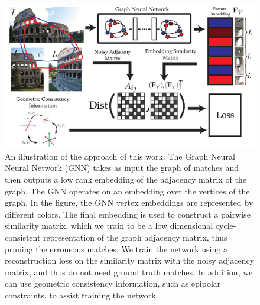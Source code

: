 \documentclass{article} %
\begin{document}

\begin{figure}[t]
\begin{center}
  \includegraphics[width=0.8\linewidth]{figures-CycleConsistencyMainFigure-v4.pdf}
\end{center}
  \caption{
    An illustration of the approach of this work.
    The Graph Neural Neural Network (GNN) \cite{battaglia2018relational} takes as input the graph of matches and then outputs a low rank embedding of the adjacency matrix of the graph.
    The GNN operates on an embedding over the vertices of the graph.
    In the figure, the GNN vertex embeddings are represented by different colors.
    The final embedding is used to construct a pairwise similarity matrix, which we train to be a low dimensional cycle-consistent representation of the graph adjacency matrix, thus pruning the erroneous matches.
    We train the network using a reconstruction loss on the similarity matrix with the noisy adjacency matrix, and thus do not need ground truth matches.
    In addition, we can use geometric consistency information, such as epipolar constraints, to assist training the network.
  }
\label{fig:pipeline}
\end{figure}
\end{document}

